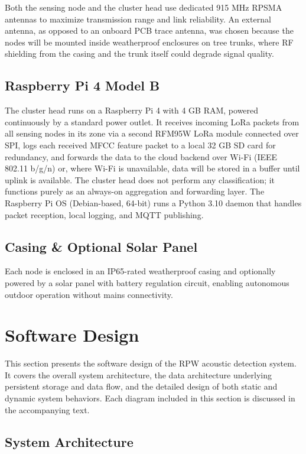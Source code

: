 \documentclass[12pt,a4paper,oneside]{memoir}
\begin{document}
Both the sensing node and the cluster head use dedicated 915 MHz RPSMA antennas to maximize transmission range and link reliability. An external antenna, as opposed to an onboard PCB trace antenna, was chosen because the nodes will be mounted inside weatherproof enclosures on tree trunks, where RF shielding from the casing and the trunk itself could degrade signal quality.

\subsection{Raspberry Pi 4 Model B}

The cluster head runs on a Raspberry Pi 4 with 4 GB RAM, powered continuously by a standard power outlet. It receives incoming LoRa packets from all sensing nodes in its zone via a second RFM95W LoRa module connected over SPI, logs each received MFCC feature packet to a local 32 GB SD card for redundancy, and forwards the data to the cloud backend over Wi-Fi (IEEE 802.11 b/g/n) or, where Wi-Fi is unavailable, data will be stored in a buffer until uplink is available. The cluster head does not perform any classification; it functions purely as an always-on aggregation and forwarding layer. The Raspberry Pi OS (Debian-based, 64-bit) runs a Python 3.10 daemon that handles packet reception, local logging, and MQTT publishing.

\subsection{Casing \& Optional Solar Panel}

Each node is enclosed in an IP65-rated weatherproof casing and optionally powered by a solar panel with battery regulation circuit, enabling autonomous outdoor operation without mains connectivity.


\section{Software Design}

This section presents the software design of the RPW acoustic detection system. It covers the overall system architecture, the data architecture underlying persistent storage and data flow, and the detailed design of both static and dynamic system behaviors. Each diagram included in this section is discussed in the accompanying text.



\subsection{System Architecture}
\end{document}

